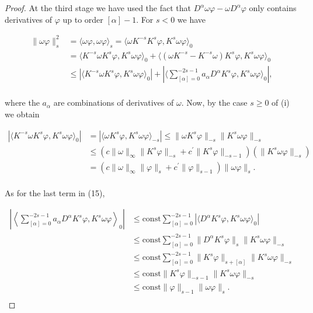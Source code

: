 \begin{proof}
At the third stage we have used the fact that  $ D^{\alpha}\omega\varphi - \omega D^{\alpha}\varphi $ only contains derivatives of  $ \varphi $ up to order $[\alpha]-1$. For $s<0$ we have

\begin{equation}
\tag{15}\label{eq:6.18:15}
\begin{aligned}{\|\omega\varphi\|_{s}^{2}}&{{}=\langle\omega\varphi,\omega\varphi\rangle_{s}=\langle\omega K^{-s}K^{s}\varphi,K^{s}\omega\varphi\rangle_{0}}\\ {}&{{}=\langle K^{-s}\omega K^{s}\varphi,K^{s}\omega\varphi\rangle_{0}+\langle(\omega K^{-s}-K^{-s}\omega)K^{s}\varphi,K^{s}\omega\varphi\rangle_{0}}\\ {}&{{}\leq|\langle K^{-s}\omega K^{s}\varphi,K^{s}\omega\varphi\rangle_{0}|+\left|\Big\langle\sum_{[\alpha]=0}^{-2s-1}a_{\alpha}D^{\alpha}K^{s}\varphi,K^{s}\omega\varphi\Big\rangle_{0}\right|,}\\ \end{aligned}
\end{equation}

where the  $ a_\alpha $ are combinations of derivatives of  $ \omega $. Now, by the case  $ s \geq 0 $ of (i) we obtain

\begin{equation}
\tag{16}\label{eq:6.18:16}
\begin{aligned}{|\langle K^{-s}\omega K^{s}\varphi,K^{s}\omega\varphi\rangle_{0}|}&{{}=|\langle\omega K^{s}\varphi,K^{s}\omega\varphi\rangle_{-s}|\leq\|\omega K^{s}\varphi\|_{-s}\|K^{s}\omega\varphi\|_{-s}}\\ {}&{{}\leq(c\|\omega\|_{\infty}\|K^{s}\varphi\|_{-s}+c^{\prime}\|K^{s}\varphi\|_{-s-1})(\|K^{s}\omega\varphi\|_{-s})}\\ {}&{{}=(c\|\omega\|_{\infty}\|\varphi\|_{s}+c^{\prime}\|\varphi\|_{s-1})\|\omega\varphi\|_{s}.}\\ \end{aligned}
\end{equation}

As for the last term in (15),

\begin{equation}
\tag{17}\label{eq:6.18:17}
\begin{aligned}{\left|\left\langle\sum_{[\alpha]=0}^{-2s-1}a_{\alpha}D^{\alpha}K^{s}\varphi,K^{s}\omega\varphi\right\rangle_{0}\right|}&{{}\leq\mathrm{const}\sum_{[\alpha]=0}^{-2s-1}|\langle D^{\alpha}K^{s}\varphi,K^{s}\omega\varphi\rangle_{0}|}\\ {}&{{}\leq\mathrm{const}\sum_{[\alpha]=0}^{-2s-1}\|D^{\alpha}K^{s}\varphi\|_{s}\|K^{s}\omega\varphi\|_{-s}}\\ {}&{{}\leq\mathrm{const}\sum_{[\alpha]=0}^{-2s-1}\|K^{s}\varphi\|_{s+[\alpha]}\|K^{s}\omega\varphi\|_{-s}}\\ {}&{{}\leq\mathrm{const}\|K^{s}\varphi\|_{-s-1}\|K^{s}\omega\varphi\|_{-s}}\\ {}&{{}\leq\mathrm{const}\|\varphi\|_{s-1}\|\omega\varphi\|_{s}.}\\ \end{aligned}
\end{equation}


\end{proof}
